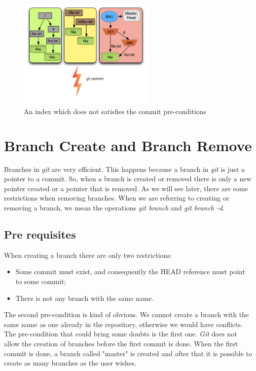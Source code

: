 \begin{figure}[tp]
   \centering
   \includegraphics[width=0.6\textwidth]{images/commit_pre.png}
   \caption{An index which does not satisfies the commit
   pre-conditions}\label{fig:commit_pre}
\end{figure}

\section{Branch Create and Branch Remove}
Branches in \emph{git} are very efficient. This happens because a
branch in \emph{git} is just a pointer to a commit. So, when a branch
is created or removed there is only a new pointer created or a
pointer that is removed. As we will see later, there are some
restrictions when removing branches. When we are referring to
creating or removing a branch, we mean the operations
\emph{git branch} and \emph{git branch -d}.

\subsection{Pre requisites}
When creating a branch there are only two restrictions:
\begin{itemize}
   \item Some commit must exist, and consequently the HEAD reference must point
   to some commit;
   \item There is not any branch with the same name.
\end{itemize}
The second pre-condition is kind of obvious. We cannot create a branch
with the same name as one already in the repository, otherwise we
would have conflicts. The pre-condition that could bring some doubts
is the first one. \emph{Git} does not allow the creation of branches
before the first commit is done. When the first commit is done, a
branch called "master" is created and after that it is possible to
create as many branches as the user wishes.\\

